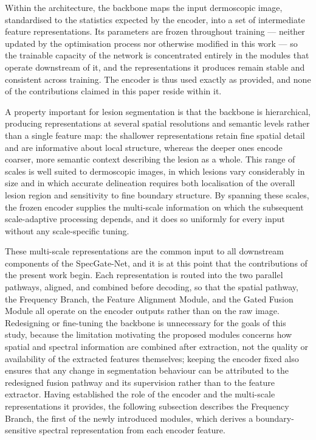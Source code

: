 Within the architecture, the backbone maps the input dermoscopic image, standardised to the statistics expected by the encoder, into a set of intermediate feature representations. Its parameters are frozen throughout training --- neither updated by the optimisation process nor otherwise modified in this work --- so the trainable capacity of the network is concentrated entirely in the modules that operate downstream of it, and the representations it produces remain stable and consistent across training. The encoder is thus used exactly as provided, and none of the contributions claimed in this paper reside within it.

A property important for lesion segmentation is that the backbone is hierarchical, producing representations at several spatial resolutions and semantic levels rather than a single feature map: the shallower representations retain fine spatial detail and are informative about local structure, whereas the deeper ones encode coarser, more semantic context describing the lesion as a whole. This range of scales is well suited to dermoscopic images, in which lesions vary considerably in size and in which accurate delineation requires both localisation of the overall lesion region and sensitivity to fine boundary structure. By spanning these scales, the frozen encoder supplies the multi-scale information on which the subsequent scale-adaptive processing depends, and it does so uniformly for every input without any scale-specific tuning.

These multi-scale representations are the common input to all downstream components of the SpecGate-Net, and it is at this point that the contributions of the present work begin. Each representation is routed into the two parallel pathways, aligned, and combined before decoding, so that the spatial pathway, the Frequency Branch, the Feature Alignment Module, and the Gated Fusion Module all operate on the encoder outputs rather than on the raw image. Redesigning or fine-tuning the backbone is unnecessary for the goals of this study, because the limitation motivating the proposed modules concerns how spatial and spectral information are combined after extraction, not the quality or availability of the extracted features themselves; keeping the encoder fixed also ensures that any change in segmentation behaviour can be attributed to the redesigned fusion pathway and its supervision rather than to the feature extractor. Having established the role of the encoder and the multi-scale representations it provides, the following subsection describes the Frequency Branch, the first of the newly introduced modules, which derives a boundary-sensitive spectral representation from each encoder feature.

